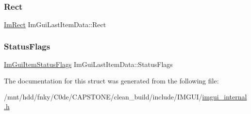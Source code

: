 \mbox{\label{structImGuiLastItemData_ad6ff8db4173ff40874ef015e58d726ae}} 
\subsubsection{\texorpdfstring{Rect}{Rect}}
{\footnotesize\ttfamily \hyperlink{structImRect}{Im\+Rect} Im\+Gui\+Last\+Item\+Data\+::\+Rect}

\mbox{\label{structImGuiLastItemData_a31712c73aac65b9ecd049308c511ed3b}} 
\subsubsection{\texorpdfstring{Status\+Flags}{StatusFlags}}
{\footnotesize\ttfamily \hyperlink{imgui__internal_8h_a86b8f9e2fd4084fb2112f003070b53fa}{Im\+Gui\+Item\+Status\+Flags} Im\+Gui\+Last\+Item\+Data\+::\+Status\+Flags}



The documentation for this struct was generated from the following file\+:\begin{DoxyCompactItemize}
\item 
/mnt/hdd/fnky/\+C0de/\+C\+A\+P\+S\+T\+O\+N\+E/clean\+\_\+build/include/\+I\+M\+G\+U\+I/\hyperlink{imgui__internal_8h}{imgui\+\_\+internal.\+h}\end{DoxyCompactItemize}
